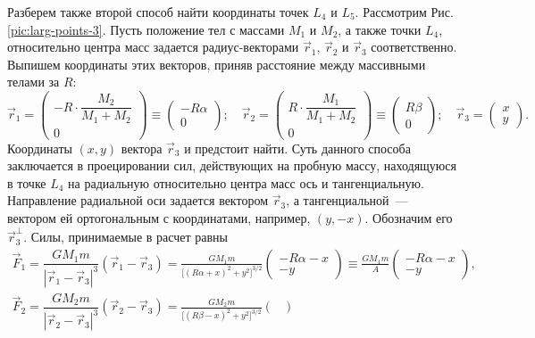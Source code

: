 \footnotesize{Разберем также второй способ найти координаты точек $L_{4}$ и $L_5$. Рассмотрим Рис.\,\ref{pic:larg-points-3}. Пусть положение тел с массами $M_1$ и $M_2$, а также точки $L_4$, относительно центра масс задается радиус-векторами $\vec{r}_1$, $\vec{r}_2$ и $\vec{r}_3$ соответственно. Выпишем координаты этих векторов, приняв расстояние между массивными телами за $R$:
\begin{equation*}
\vec{r}_1 = \begin{pmatrix}
-R \cdot \dfrac{M_2}{M_1 + M_2}\\[.5pc]
0
\end{pmatrix} \equiv \begin{pmatrix}
-R \alpha\\
0
\end{pmatrix}; \quad
\vec{r}_2 = \begin{pmatrix}
R \cdot \dfrac{M_1}{M_1 + M_2}\\[.5pc]
0
\end{pmatrix} \equiv \begin{pmatrix}
R \beta\\
0
\end{pmatrix}; \quad
\vec{r}_3 = \begin{pmatrix}
x\\
y
\end{pmatrix}.
\end{equation*}
Координаты $(x, y)$ вектора $\vec{r}_3$  и предстоит найти. Суть данного способа заключается в проецировании сил, действующих на пробную массу, находящуюся в точке $L_4$ на радиальную относительно центра масс ось и тангенциальную. Направление радиальной оси задается вектором $\vec{r}_3$, а тангенциальной~---  вектором ей ортогональным с координатами, например, $(y, -x)$. Обозначим его $\vec{r}_3^\perp$. Силы, принимаемые в расчет равны
\begin{gather*}
\vec{F}_1 = \dfrac{G M_1 m}{|\vec{r}_1 - \vec{r}_3 |^3} (\vec{r}_1 - \vec{r}_3) = \frac{G M_1 m}{\big[ (R \alpha + x)^2 + y^2 \big]^{3/2}}\begin{pmatrix}
-R\alpha - x\\
-y
\end{pmatrix} \equiv \frac{G M_1 m}{A}\begin{pmatrix}
-R\alpha - x\\
-y
\end{pmatrix} ,\\
\vec{F}_2 = \dfrac{G M_2 m}{|\vec{r}_2 - \vec{r}_3 |^3} (\vec{r}_2 - \vec{r}_3) = \frac{G M_2 m}{\big[ (R \beta - x)^2 + y^2 \big]^{3/2}}\begin{pmatrix}

\end{pmatrix}
\end{gather*}}
